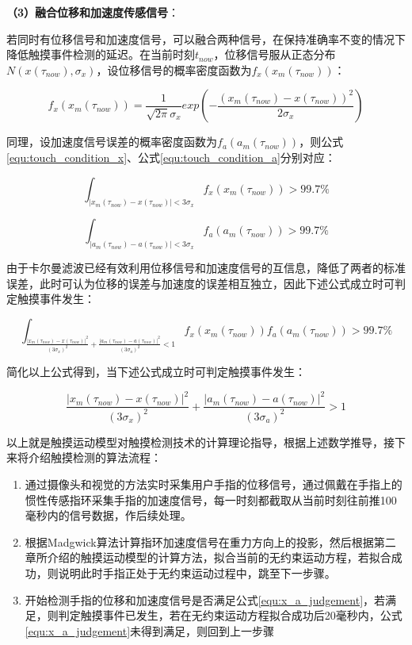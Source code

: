 \textbf{（3）融合位移和加速度传感信号}：

若同时有位移信号和加速度信号，可以融合两种信号，在保持准确率不变的情况下降低触摸事件检测的延迟。在当前时刻$t_{now}$，位移信号服从正态分布$N(x(\tau_{now}),\sigma_x)$，设位移信号的概率密度函数为$f_x(x_m(\tau_{now}))$：

\begin{equation}
	f_x(x_m(\tau_{now}))=\frac{1}{\sqrt{2\pi}\sigma_x}exp\left(-\frac{(x_m(\tau_{now})-x(\tau_{now}))^2}{2\sigma_x}\right)
\end{equation}

同理，设加速度信号误差的概率密度函数为$f_a(a_m(\tau_{now}))$，则公式\ref{equ:touch_condition_x}、公式\ref{equ:touch_condition_a}分别对应：

\begin{equation}
	\int_{\lvert x_m(\tau_{now})-x(\tau_{now})\rvert<3\sigma_x}f_x(x_m(\tau_{now}))>99.7\%
\end{equation}

\begin{equation}
	\int_{\lvert a_m(\tau_{now})-a(\tau_{now})\rvert<3\sigma_x}f_a(a_m(\tau_{now}))>99.7\%
\end{equation}

由于卡尔曼滤波已经有效利用位移信号和加速度信号的互信息，降低了两者的标准误差，此时可认为位移的误差与加速度的误差相互独立，因此下述公式成立时可判定触摸事件发生：

\begin{equation}
	\int_{\frac{\lvert x_m(\tau_{now})-x(\tau_{now})\rvert^2}{(3\sigma_x)^2}+\frac{\lvert a_m(\tau_{now})-a(\tau_{now})\rvert^2}{(3\sigma_a)^2}<1}f_x(x_m(\tau_{now}))f_a(a_m(\tau_{now}))>99.7\%
\end{equation}

简化以上公式得到，当下述公式成立时可判定触摸事件发生：

\begin{equation}
	\frac{\lvert x_m(\tau_{now})-x(\tau_{now})\rvert^2}{(3\sigma_x)^2}+
	\frac{\lvert a_m(\tau_{now})-a(\tau_{now})\rvert^2}{(3\sigma_a)^2}>1
\label{equ:x_a_judgement}
\end{equation}

以上就是触摸运动模型对触摸检测技术的计算理论指导，根据上述数学推导，接下来将介绍触摸检测的算法流程：

\begin{enumerate}
\item 通过摄像头和视觉的方法实时采集用户手指的位移信号，通过佩戴在手指上的惯性传感指环采集手指的加速度信号，每一时刻都截取从当前时刻往前推100毫秒内的信号数据，作后续处理。
\item 根据Madgwick算法\cite{madgwick2010efficient}计算指环加速度信号在重力方向上的投影，然后根据第二章所介绍的触摸运动模型的计算方法，拟合当前的无约束运动方程，若拟合成功，则说明此时手指正处于无约束运动过程中，跳至下一步骤。
\item 开始检测手指的位移和加速度信号是否满足公式\ref{equ:x_a_judgement}，若满足，则判定触摸事件已发生，若在无约束运动方程拟合成功后20毫秒内，公式\ref{equ:x_a_judgement}未得到满足，则回到上一步骤
\end{enumerate}

